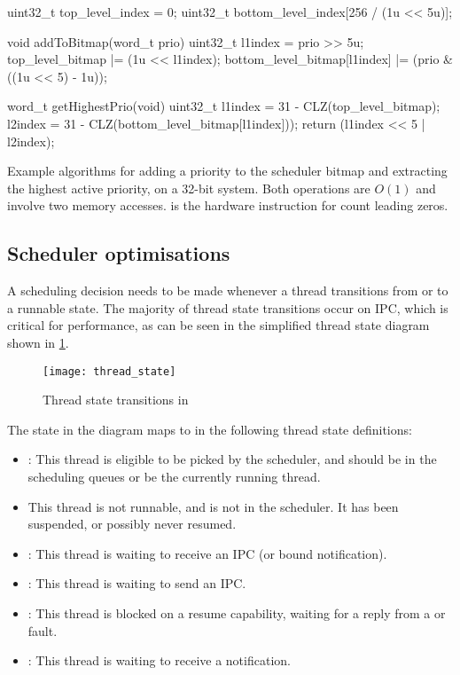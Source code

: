 \begin{listing}
    \begin{ccode}
uint32_t top_level_index = 0;
uint32_t bottom_level_index[256 / (1u << 5u)];

void addToBitmap(word_t prio) {
    uint32_t l1index = prio >> 5u;
    top_level_bitmap |= (1u << l1index);
    bottom_level_bitmap[l1index] |= (prio & ((1u << 5) - 1u));
}

word_t getHighestPrio(void) {
    uint32_t l1index = 31 - CLZ(top_level_bitmap);
    l2index = 31 - CLZ(bottom_level_bitmap[l1index]));
    return (l1index << 5 | l2index);
}
    \end{ccode}
    \caption{Example algorithms for adding a priority to the scheduler bitmap and extracting the highest
        active priority, on a 32-bit system. Both operations are $O(1)$ and involve two memory
        accesses. 
     is the hardware instruction for count leading zeros.}
    \label{list:two-lvl-bitmap}
\end{listing}

\subsection{Scheduler optimisations}

A scheduling decision needs to be made whenever a thread transitions from or to a runnable state.
The majority of thread state transitions occur on IPC, which is critical for performance, 
as can be seen in the simplified thread state diagram shown in \cref{f:thread_state}. 
\begin{figure}[h!tb]
    \centering
    \texttt{[image: thread\_state]}
    \caption{Thread state transitions in \selfour}
    \label{f:thread_state}
\end{figure}
The  state in the diagram maps to  in the following thread
state definitions:
\begin{itemize}
    \item {}: This thread is eligible to be picked by the scheduler, and should be in the
        scheduling queues or be the currently running thread.
    \item {} This thread is not runnable, and is not in the scheduler. It has been
        suspended, or possibly never resumed. 
    \item {}: This thread is waiting to receive an IPC (or bound notification). 
    \item {}: This thread is waiting to send an IPC. 
    \item {}: This thread is blocked on a resume capability, waiting for a reply
        from a  or fault.
    \item {}: This thread is waiting to receive a notification.
\end{itemize}

